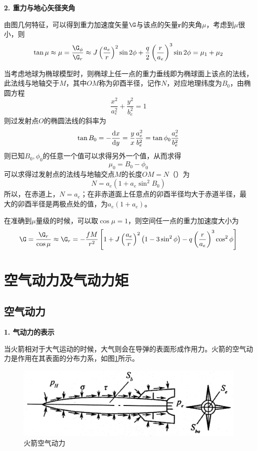 \noindent \textbf{2. 重力与地心矢径夹角}

由图几何特征，可以得到重力加速度矢量$\bm{\G}$与该点的矢量$\bm{r}$的夹角$\mu$，考虑到$\mu$很小，则
\begin{equation}
	\tan \mu \approx \mu = \dfrac{\G_\phi}{\G_r} \approx J \left(\dfrac{a_e}{r}\right)^2 \sin 2\phi + \dfrac{q}{2} \left(\dfrac{r}{a_e}\right)^3  \sin 2\phi = \mu_1 + \mu_2 
\end{equation}

当考虑地球为椭球模型时，则椭球上任一点的重力垂线即为椭球面上该点的法线，此法线与地轴交于$M$，其中$OM$称为卯酉半径，记作$N$，对应地理纬度为$B_0$，由椭圆方程
\begin{equation}
	\dfrac{x^2 }{a_e^2} + \dfrac{y^2}{b_e^2} = 1
\end{equation}
则过发射点$O$的椭圆法线的斜率为
\begin{equation}
	\tan B_0 = - \dfrac{{\rm{d}} x}{{\rm{d}} y} = \dfrac{y}{x}\dfrac{a_e^2}{b_e^2} = \tan \phi_0 \dfrac{a_e^2}{b_e^2}
\end{equation}
则已知$B_0,\phi_0$的任意一个值可以求得另外一个值，从而求得
\begin{equation}
	\mu_0 = B_0 - \phi_0
\end{equation}
可以求得过发射点的法线与地轴交点$M$的长度$OM = N$（）为
\begin{equation}
	N = a_e(1 + a_e \sin^2 B_0)
\end{equation}
所以，在赤道上，$N = a_e$；在非赤道面上任意点的卯酉半径均大于赤道半径，最大的卯酉半径是两极点处的值，为$a_e(1 + a_e)$。

在准确到$\mu$量级的时候，可以取$\cos \mu = 1$，则空间任一点的重力加速度大小为
\begin{equation}
	\G  = \dfrac{\G_r}{\cos \mu} \approx \G_r = - \dfrac{fM}{r^2}\left[1+J \left(\dfrac{a_e}{r}\right)^2\big(1 - 3 \sin^2 \phi\big) - q \left(\dfrac{r}{a_e}\right)^3 \cos^2 \phi\right]
\end{equation}

\section{空气动力及气动力矩}
\subsection{空气动力}
\noindent \textbf{1. 气动力的表示}

当火箭相对于大气运动的时候，大气则会在导弹的表面形成作用力。火箭的空气动力是作用在其表面的分布力系，如图\ref{火箭空气动力}所示。
\begin{figure}[!htb]
	\centering
	\includegraphics[width=0.6\linewidth]{pic/火箭空气动力.jpg}
	\caption{火箭空气动力}
	\label{火箭空气动力}
\end{figure}

